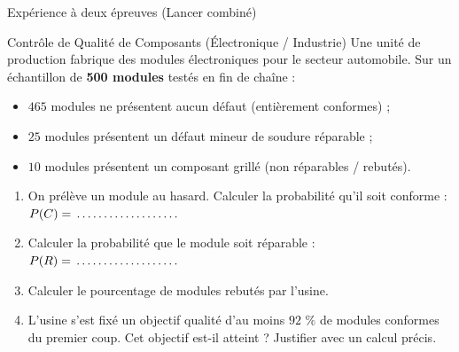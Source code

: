 \begin{exercice}[3 pts]{\capRealiser}{Expérience à deux épreuves (Lancer combiné)}
\begin{center}
\end{center}
\end{exercice}

\begin{exercice}[4 pts]{\capAnalyser}{Contrôle de Qualité de Composants (Électronique / Industrie)}
Une unité de production fabrique des modules électroniques pour le secteur automobile. Sur un échantillon de \textbf{500 modules} testés en fin de chaîne :
\begin{itemize}[leftmargin=1.5em, itemsep=1pt]
    \item $465$ modules ne présentent aucun défaut (entièrement conformes) ;
    \item $25$ modules présentent un défaut mineur de soudure réparable ;
    \item $10$ modules présentent un composant grillé (non réparables / rebutés).
\end{itemize}

\begin{enumerate}[leftmargin=1.5em]
    \item On prélève un module au hasard. Calculer la probabilité qu'il soit conforme : $P(C) = \pointille[3cm]$
    \item Calculer la probabilité que le module soit réparable : $P(R) = \pointille[3cm]$
    \item Calculer le pourcentage de modules rebutés par l'usine.
    \item L'usine s'est fixé un objectif qualité d'au moins $92\text{ \%}$ de modules conformes du premier coup. Cet objectif est-il atteint ? Justifier avec un calcul précis.
\end{enumerate}
\lignesreponse[4]
\end{exercice}

